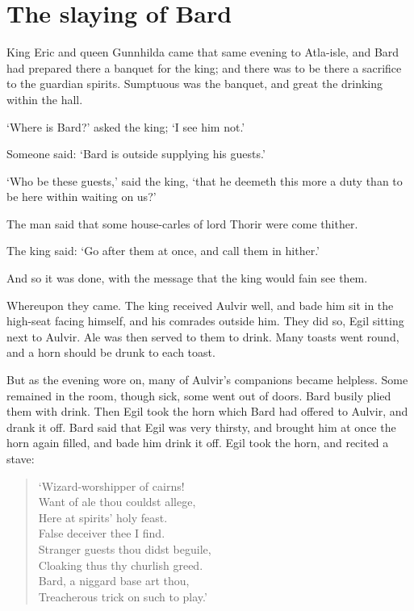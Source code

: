 \chapter{The slaying of Bard}

King Eric and queen Gunnhilda came that same evening to Atla-isle, and Bard had prepared there a banquet for the king; and there was to be there a sacrifice to the guardian spirits. Sumptuous was the banquet, and great the drinking within the hall.

`Where is Bard?' asked the king; `I see him not.'

Someone said: `Bard is outside supplying his guests.'

`Who be these guests,' said the king, `that he deemeth this more a duty than to be here within waiting on us?'

The man said that some house-carles of lord Thorir were come thither.

The king said: `Go after them at once, and call them in hither.'

And so it was done, with the message that the king would fain see them.

Whereupon they came. The king received Aulvir well, and bade him sit in the high-seat facing himself, and his comrades outside him. They did so, Egil sitting next to Aulvir. Ale was then served to them to drink. Many toasts went round, and a horn should be drunk to each toast.

But as the evening wore on, many of Aulvir's companions became helpless. Some remained in the room, though sick, some went out of doors. Bard busily plied them with drink. Then Egil took the horn which Bard had offered to Aulvir, and drank it off. Bard said that Egil was very thirsty, and brought him at once the horn again filled, and bade him drink it off. Egil took the horn, and recited a stave:

\begin{verse}
`Wizard-worshipper of cairns! \\
Want of ale thou couldst allege, \\
Here at spirits' holy feast. \\
False deceiver thee I find. \\
Stranger guests thou didst beguile, \\
Cloaking thus thy churlish greed. \\
Bard, a niggard base art thou, \\
Treacherous trick on such to play.' \\
\end{verse}

